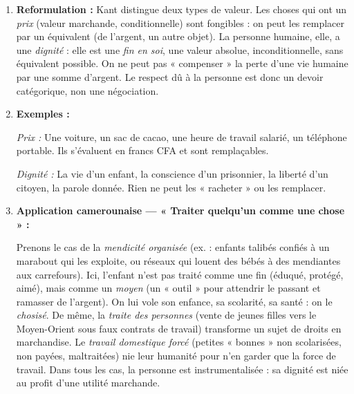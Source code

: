 \documentclass[11pt]{article}
\begin{document}
\begin{corrige}
\begin{enumerate}
\item \textbf{Reformulation :} Kant distingue deux types de valeur. Les choses qui ont un \emph{prix} (valeur marchande, conditionnelle) sont fongibles : on peut les remplacer par un équivalent (de l'argent, un autre objet). La personne humaine, elle, a une \emph{dignité} : elle est une \emph{fin en soi}, une valeur absolue, inconditionnelle, sans équivalent possible. On ne peut pas « compenser » la perte d'une vie humaine par une somme d'argent. Le respect dû à la personne est donc un devoir catégorique, non une négociation.
\item \textbf{Exemples :}
\par \textit{Prix :} Une voiture, un sac de cacao, une heure de travail salarié, un téléphone portable. Ils s'évaluent en francs CFA et sont remplaçables.
\par \textit{Dignité :} La vie d'un enfant, la conscience d'un prisonnier, la liberté d'un citoyen, la parole donnée. Rien ne peut les « racheter » ou les remplacer.
\item \textbf{Application camerounaise — « Traiter quelqu'un comme une chose » :}
\par Prenons le cas de la \emph{mendicité organisée} (ex. : enfants talibés confiés à un marabout qui les exploite, ou réseaux qui louent des bébés à des mendiantes aux carrefours). Ici, l'enfant n'est pas traité comme une fin (éduqué, protégé, aimé), mais comme un \emph{moyen} (un « outil » pour attendrir le passant et ramasser de l'argent). On lui vole son enfance, sa scolarité, sa santé : on le \emph{chosisé}. De même, la \emph{traite des personnes} (vente de jeunes filles vers le Moyen-Orient sous faux contrats de travail) transforme un sujet de droits en marchandise. Le \emph{travail domestique forcé} (petites « bonnes » non scolarisées, non payées, maltraitées) nie leur humanité pour n'en garder que la force de travail. Dans tous les cas, la personne est instrumentalisée : sa dignité est niée au profit d'une utilité marchande.
\end{enumerate}
\end{corrige}
\end{document}
